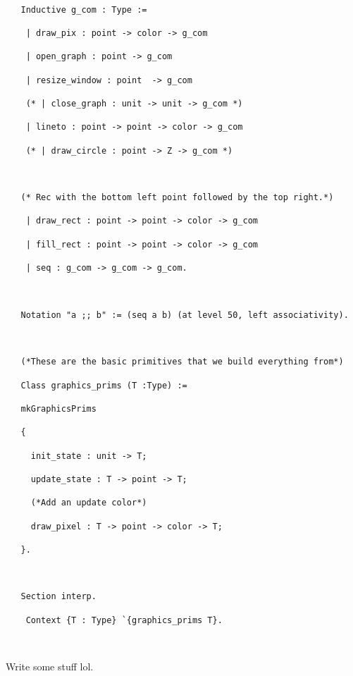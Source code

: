 \documentclass{llncs}
\begin{document}
 \begin{lstlisting}

   Inductive g_com : Type :=

    | draw_pix : point -> color -> g_com

    | open_graph : point -> g_com

    | resize_window : point  -> g_com

    (* | close_graph : unit -> unit -> g_com *)

    | lineto : point -> point -> color -> g_com

    (* | draw_circle : point -> Z -> g_com *)



   (* Rec with the bottom left point followed by the top right.*)          

    | draw_rect : point -> point -> color -> g_com

    | fill_rect : point -> point -> color -> g_com

    | seq : g_com -> g_com -> g_com.



   Notation "a ;; b" := (seq a b) (at level 50, left associativity).



   (*These are the basic primitives that we build everything from*)

   Class graphics_prims (T :Type) :=

   mkGraphicsPrims

   {

     init_state : unit -> T;

     update_state : T -> point -> T;

     (*Add an update color*)

     draw_pixel : T -> point -> color -> T;

   }.



   Section interp.

    Context {T : Type} `{graphics_prims T}.



  \end{lstlisting}

  

  Write some stuff lol.
\end{document}
